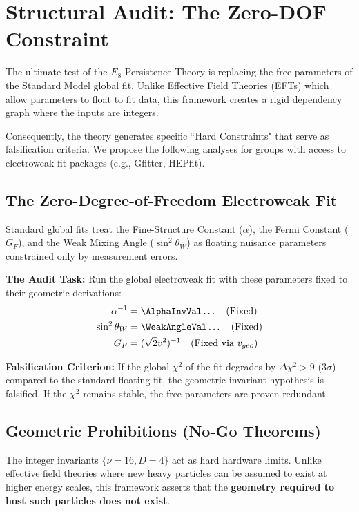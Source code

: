 \section{Structural Audit: The Zero-DOF Constraint}

The ultimate test of the $E_8$-Persistence Theory is replacing the free parameters of the Standard Model global fit. Unlike Effective Field Theories (EFTs) which allow parameters to float to fit data, this framework creates a rigid dependency graph where the inputs are integers.

Consequently, the theory generates specific ``Hard Constraints" that serve as falsification criteria. We propose the following analyses for groups with access to electroweak fit packages (e.g., Gfitter, HEPfit).

\subsection{The Zero-Degree-of-Freedom Electroweak Fit}

Standard global fits treat the Fine-Structure Constant ($\alpha$), the Fermi Constant ($G_F$), and the Weak Mixing Angle ($\sin^2\theta_W$) as floating nuisance parameters constrained only by measurement errors. 

\textbf{The Audit Task:} Run the global electroweak fit with these parameters fixed to their geometric derivations:
\begin{align}
\alpha^{-1} &= \AlphaInvVal \dots \quad (\text{Fixed}) \\
\sin^2 \theta_W &= \WeakAngleVal \dots \quad (\text{Fixed}) \\
G_F &= (\sqrt{2}v^2)^{-1} \quad (\text{Fixed via } v_{geo})
\end{align}

\textbf{Falsification Criterion:} If the global $\chi^2$ of the fit degrades by $\Delta\chi^2 > 9$ ($3\sigma$) compared to the standard floating fit, the geometric invariant hypothesis is falsified. If the $\chi^2$ remains stable, the free parameters are proven redundant.


\subsection{Geometric Prohibitions (No-Go Theorems)}

The integer invariants $\{\nu=16, D=4\}$ act as hard hardware limits. Unlike effective field theories where new heavy particles can be assumed to exist at higher energy scales, this framework asserts that the \textbf{geometry required to host such particles does not exist}.


